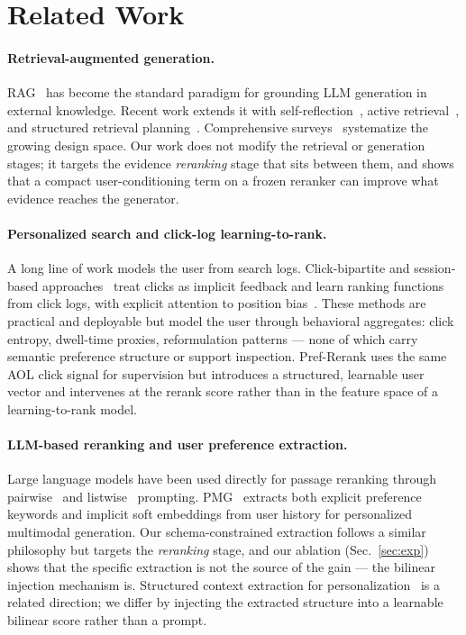 \section{Related Work}
\label{sec:related}

\paragraph{Retrieval-augmented generation.}
RAG~\cite{lewis2020rag} has become the standard paradigm for grounding LLM generation in external knowledge. Recent work extends it with self-reflection~\cite{asai2024selfrag}, active retrieval~\cite{jiang2023adaptive}, and structured retrieval planning~\cite{gao2023selfrag}. Comprehensive surveys~\cite{sun2024ragsurvey} systematize the growing design space. Our work does not modify the retrieval or generation stages; it targets the evidence \emph{reranking} stage that sits between them, and shows that a compact user-conditioning term on a frozen reranker can improve what evidence reaches the generator.

\paragraph{Personalized search and click-log learning-to-rank.}
A long line of work models the user from search logs. Click-bipartite and session-based approaches~\cite{craswell2007click,joachims2017unbiased} treat clicks as implicit feedback and learn ranking functions from click logs, with explicit attention to position bias~\cite{joachims2007evaluating,craswell2008experimental}. These methods are practical and deployable but model the user through behavioral aggregates: click entropy, dwell-time proxies, reformulation patterns --- none of which carry semantic preference structure or support inspection. Pref-Rerank uses the same AOL click signal for supervision but introduces a structured, learnable user vector and intervenes at the rerank score rather than in the feature space of a learning-to-rank model.

\paragraph{LLM-based reranking and user preference extraction.}
Large language models have been used directly for passage reranking through pairwise~\cite{qin2023llmrerank,gao2024pairwise} and listwise~\cite{pradeep2023rankgpt} prompting. PMG~\cite{shi2024pmg} extracts both explicit preference keywords and implicit soft embeddings from user history for personalized multimodal generation. Our schema-constrained extraction follows a similar philosophy but targets the \emph{reranking} stage, and our ablation (Sec.~\ref{sec:exp}) shows that the specific extraction is not the source of the gain --- the bilinear injection mechanism is. Structured context extraction for personalization~\cite{zhu2024personalized} is a related direction; we differ by injecting the extracted structure into a learnable bilinear score rather than a prompt.

